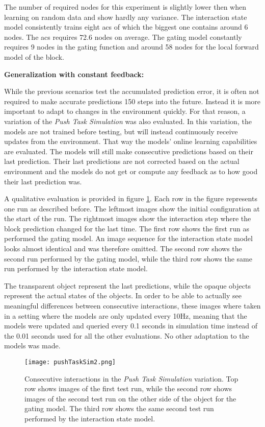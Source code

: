 The number of required nodes for this experiment is slightly lower then when learning on random data and show hardly any variance. The interaction state model consistently trains eight \glspl{ac} of which the biggest one contains around 6 nodes. The \gls{acs} requires 72.6 nodes on average. 
The gating model constantly requires 9 nodes in the gating function and around 58 nodes for the local forward model of the block.

\textbf{Generalization with constant feedback:}

While the previous scenarios test the accumulated prediction error, it is often not required to make accurate predictions 150 steps into the future. Instead it is more important to adapt to changes in the environment quickly. For that reason, a variation of the \textit{Push Task Simulation} was also evaluated. In this variation, the models are not trained before testing, but will instead continuously receive updates from the environment. That way the models' online learning capabilities are evaluated. The models will still make consecutive predictions based on their last prediction. Their last predictions are not corrected based on the actual environment and the models do not get or compute any feedback as to how good their last prediction was. 

A qualitative evaluation is provided in figure \ref{fig:pushTaskSim2}. Each row in the figure represents one run as described before. The leftmost images show the initial configuration at the start of the run. The rightmost images show the interaction step where the block prediction changed for the last time. 
The first row shows the first run as performed the gating model. An image sequence for the interaction state model looks almost identical and was therefore omitted. The second row shows the second run performed by the gating model, while the third row shows the same run performed by the interaction state model.

The transparent object represent the last predictions, while the opaque objects represent the actual states of the objects. 
In order to be able to actually see meaningful differences between consecutive interactions, these images where taken in a setting where the models are only updated every 10Hz, meaning that the models were updated and queried every 0.1 seconds in simulation time instead of the 0.01 seconds used for all the other evaluations. No other adaptation to the models was made. 

\begin{figure}
\centering
\texttt{[image: pushTaskSim2.png]}
\caption{Consecutive interactions in the \textit{Push Task Simulation} variation. Top row shows images of the first test run, while the second row shows images of the second test run on the other side of the object for the gating model. The third row shows the same second test run performed by the interaction state model.}
\label{fig:pushTaskSim2}
\end{figure}

